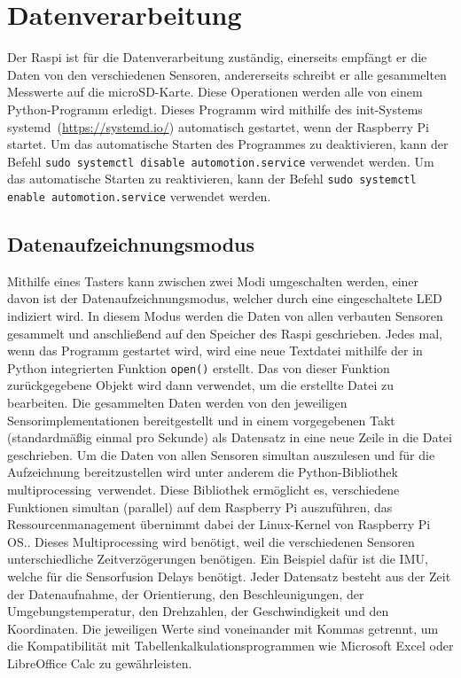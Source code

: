 \section{Datenverarbeitung}
\label{sec:Datenverarbeitung}
Der \ac{Raspi} ist für die Datenverarbeitung zuständig, einerseits empfängt er die Daten von den verschiedenen Sensoren, andererseits schreibt er alle gesammelten Messwerte auf die microSD-Karte. Diese Operationen werden alle von einem Python-Programm erledigt. Dieses Programm wird mithilfe des init-Systems \glqq systemd\grqq\ (\url{https://systemd.io/}) automatisch gestartet, wenn der Raspberry Pi startet. Um das automatische Starten des Programmes zu deaktivieren, kann der Befehl \verb|sudo systemctl disable automotion.service| verwendet werden. Um das automatische Starten zu reaktivieren, kann der Befehl \verb|sudo systemctl enable automotion.service| verwendet werden.
\subsection{Datenaufzeichnungsmodus}
\label{subsec:Datenaufzeichnungsmodus}
Mithilfe eines Tasters kann zwischen zwei Modi umgeschalten werden, einer davon ist der Datenaufzeichnungsmodus, welcher durch eine eingeschaltete \ac{LED} indiziert wird. In diesem Modus werden die Daten von allen verbauten Sensoren gesammelt und anschließend auf den Speicher des \ac{Raspi} geschrieben. Jedes mal, wenn das Programm gestartet wird, wird eine neue Textdatei mithilfe der in Python integrierten Funktion \verb|open()| erstellt. Das von dieser Funktion zurückgegebene Objekt wird dann verwendet, um die erstellte Datei zu bearbeiten. Die gesammelten Daten werden von den jeweiligen Sensorimplementationen bereitgestellt und in einem vorgegebenen Takt (standardmäßig einmal pro Sekunde) als Datensatz in eine neue Zeile in die Datei geschrieben. Um die Daten von allen Sensoren simultan auszulesen und für die Aufzeichnung bereitzustellen wird unter anderem die Python-Bibliothek \glqq multiprocessing\grqq\ verwendet. Diese Bibliothek ermöglicht es, verschiedene Funktionen simultan (parallel) auf dem Raspberry Pi auszuführen, das Ressourcenmanagement übernimmt dabei der Linux-Kernel von Raspberry Pi OS.. Dieses Multiprocessing wird benötigt, weil die verschiedenen Sensoren unterschiedliche Zeitverzögerungen benötigen. Ein Beispiel dafür ist die \ac{IMU}, welche für die Sensorfusion Delays benötigt. Jeder Datensatz besteht aus der Zeit der Datenaufnahme, der Orientierung, den Beschleunigungen, der Umgebungstemperatur, den Drehzahlen, der Geschwindigkeit und den Koordinaten. Die jeweiligen Werte sind voneinander mit Kommas getrennt, um die Kompatibilität mit Tabellenkalkulationsprogrammen wie Microsoft Excel oder LibreOffice Calc zu gewährleisten.
